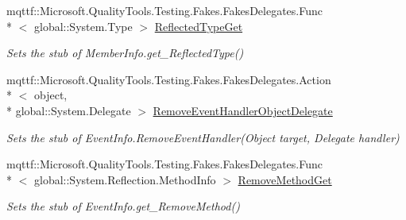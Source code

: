 \begin{DoxyCompactItemize}
mqttf\-::\-Microsoft.\-Quality\-Tools.\-Testing.\-Fakes.\-Fakes\-Delegates.\-Func\\*
$<$ global\-::\-System.\-Type $>$ \hyperlink{class_system_1_1_reflection_1_1_fakes_1_1_stub_event_info_adfc08de91ed88826ba9bb5324ecf908c}{Reflected\-Type\-Get}
\begin{DoxyCompactList}\small\item\em Sets the stub of Member\-Info.\-get\-\_\-\-Reflected\-Type()\end{DoxyCompactList}\item 
mqttf\-::\-Microsoft.\-Quality\-Tools.\-Testing.\-Fakes.\-Fakes\-Delegates.\-Action\\*
$<$ object, \\*
global\-::\-System.\-Delegate $>$ \hyperlink{class_system_1_1_reflection_1_1_fakes_1_1_stub_event_info_ad623474ee80ce5b142481981142c6bab}{Remove\-Event\-Handler\-Object\-Delegate}
\begin{DoxyCompactList}\small\item\em Sets the stub of Event\-Info.\-Remove\-Event\-Handler(\-Object target, Delegate handler)\end{DoxyCompactList}\item 
mqttf\-::\-Microsoft.\-Quality\-Tools.\-Testing.\-Fakes.\-Fakes\-Delegates.\-Func\\*
$<$ global\-::\-System.\-Reflection.\-Method\-Info $>$ \hyperlink{class_system_1_1_reflection_1_1_fakes_1_1_stub_event_info_a23f7c867756dc68e1f577faa3d73d73d}{Remove\-Method\-Get}
\begin{DoxyCompactList}\small\item\em Sets the stub of Event\-Info.\-get\-\_\-\-Remove\-Method()\end{DoxyCompactList}\end{DoxyCompactItemize}
